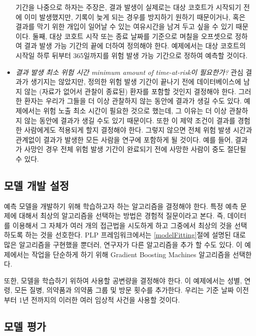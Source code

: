 \documentclass[10.5pt]{book}
\theoremstyle{definition}
\theoremstyle{definition}
\theoremstyle{definition}
\theoremstyle{remark}
\begin{document}
\begin{itemize}
  기간을 나중으로 하자는 주장은, 결과 발생이 실제로는 대상 코호트가
  시작되기 전에 이미 발생했지만, 기록이 늦게 되는 경우를 방지하기 원하기
  때문이거나, 혹은 결과를 막기 위한 개입이 일어날 수 있는 여유시간을
  남겨 두고 싶을 수 있기 때문이다. 둘째, 대상 코호트 시작 또는 종료
  날짜를 기준으로 며칠을 오프셋으로 정하여 결과 발생 가능 기간의 끝에
  더하여 정의해야 한다. 예제에서는 대상 코호트의 시작일 하루 뒤부터
  365일까지를 위험 발생 가능 기간으로 정하여 예측할 것이다.
\item
  \emph{결과 발생 최소 위험 시간 minimum amount of time-at-risk이
  필요한가?} 관심 결과가 생기지는 않았지만, 정의한 위험 발생 기간이
  끝나기 전에 데이터베이스에 남지 않는 (자료가 없어서 관찰이 종료된)
  환자를 포함할 것인지 결정해야 한다. 그러한 환자는 우리가 그들을 더
  이상 관찰하지 않는 동안에 결과가 생길 수도 있다. 예제에서는 위험 노출
  최소 시간이 필요한 것으로 했는데, 그 이유는 더 이상 관찰하지 않는
  동안에 결과가 생길 수도 있기 때문이다. 또한 이 제약 조건이 결과를
  경험한 사람에게도 적용되게 할지 결정해야 한다. 그렇지 않으면 전체 위험
  발생 시간과 관계없이 결과가 발생한 모든 사람을 연구에 포함하게 될
  것이다. 예를 들어, 결과가 사망인 경우 전체 위험 발생 기간이 완료되기
  전에 사망한 사람이 중도 절단될 수 있다.
\end{itemize}

\subsection{모델 개발 설정}\label{--}

예측 모델을 개발하기 위해 학습하고자 하는 알고리즘을 결정해야 한다. 특정
예측 문제에 대해서 최상의 알고리즘을 선택하는 방법은 경험적 질문이라고
본다. 즉, 데이터를 이용해서 그 자체가 여러 개의 접근법을 시도하게 하고
그중에서 최상의 것을 선택하도록 하는 것을 선호한다. PLP 프레임워크에서는
\ref{modelFitting}절에 설명된 대로 많은 알고리즘을 구현했을 뿐더러,
연구자가 다른 알고리즘을 추가 할 수도 있다. 이 예제에서는 작업을
단순하게 하기 위해 Gradient Boosting Machines 알고리즘을 선택한다.

또한, 모델을 학습하기 위하여 사용할 공변량을 결정해야 한다. 이
예제에서는 성별, 연령, 모든 질병, 의약품과 의약품 그룹 및 방문 횟수를
추가한다. 우리는 기준 날짜 이전부터 1년 전까지의 이러한 여러 임상적
사건을 사용할 것이다.

\subsection{모델 평가}\label{-}
\end{document}
